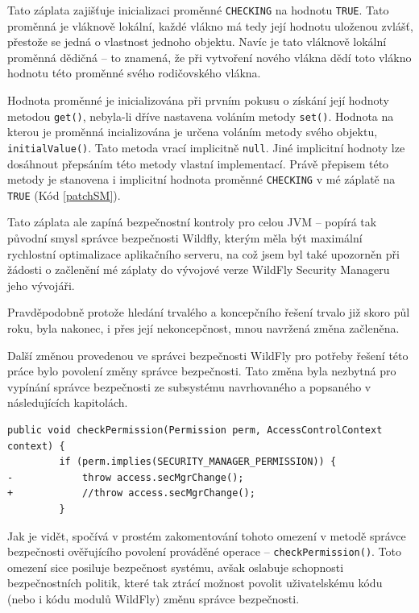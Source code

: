 Tato záplata zajišťuje inicializaci proměnné {\tt CHECKING} na hodnotu {\tt TRUE}. Tato proměnná je vláknově lokální, každé vlákno má tedy její hodnotu uloženou zvlášť, přestože se jedná o vlastnost jednoho objektu. Navíc je tato vláknově lokální proměnná dědičná -- to znamená, že při vytvoření nového vlákna dědí toto vlákno hodnotu této proměnné svého rodičovského vlákna. \cite{refInheritableThreadLocal}\cite{refThreadLocal}

Hodnota proměnné je inicializována při prvním pokusu o získání její hodnoty metodou {\tt get()}, nebyla-li dříve nastavena voláním metody {\tt set()}. Hodnota na kterou je proměnná incializována je určena voláním metody svého objektu, {\tt initialValue()}. Tato metoda vrací implicitně {\tt null}. Jiné implicitní hodnoty lze dosáhnout přepsáním této metody vlastní implementací. Právě přepisem této metody je stanovena i implicitní hodnota proměnné {\tt CHECKING} v mé záplatě na {\tt TRUE} (Kód \ref{patchSM}). \cite{refThreadLocal}

Tato záplata ale zapíná bezpečnostní kontroly pro celou JVM -- popírá tak původní smysl správce bezpečnosti Wildfly, kterým měla být maximální rychlostní optimalizace aplikačního serveru, na což jsem byl také upozorněn při žádosti o začlenění mé záplaty do vývojové verze WildFly Security Manageru jeho vývojáři. \cite{smPullRequest}

Pravděpodobně protože hledání trvalého a koncepčního řešení trvalo již skoro půl roku, byla nakonec, i přes její nekoncepčnost, mnou navržená změna začleněna. \cite{smPullRequest}\cite{smPullRequestImpl}

Další změnou provedenou ve správci bezpečnosti WildFly pro potřeby řešení této práce bylo povolení změny správce bezpečnosti. Tato změna byla nezbytná pro vypínání správce bezpečnosti ze subsystému navrhovaného a popsaného v následujících kapitolách.

\begin{lstlisting}[caption=Záplata správce bezpečnosti WildFly umožňující vypnutí správce bezpečnosti (zkráceno), label=patchSM]
     public void checkPermission(Permission perm, AccessControlContext context) {
         if (perm.implies(SECURITY_MANAGER_PERMISSION)) {
-            throw access.secMgrChange();
+            //throw access.secMgrChange();
         }
\end{lstlisting}

Jak je vidět, spočívá v prostém zakomentování tohoto omezení v metodě správce bezpečnosti ověřujícího povolení prováděné operace -- {\tt checkPermission()}. Toto omezení sice posiluje bezpečnost systému, avšak oslabuje schopnosti bezpečnostních politik, které tak ztrácí možnost povolit uživatelskému kódu (nebo i kódu modulů WildFly) změnu správce bezpečnosti.

